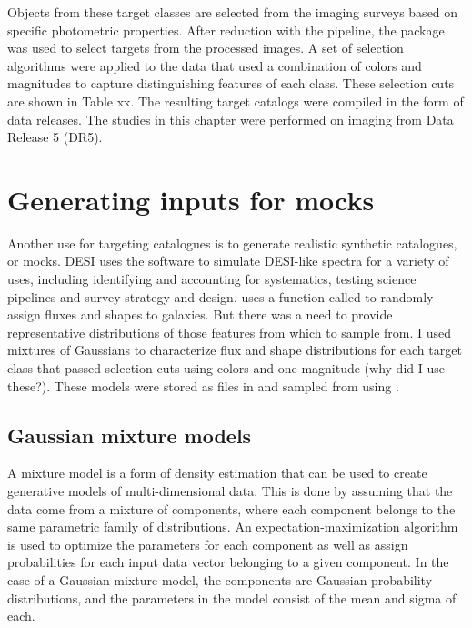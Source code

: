 Objects from these target classes are selected from the imaging surveys based on specific photometric properties. After reduction with the  pipeline, the  package was used to select targets from the processed images. A set of selection algorithms were applied to the data that used a combination of colors and magnitudes to capture distinguishing features of each class. These selection cuts are shown in Table xx. The resulting target catalogs were compiled in the form of data releases. The studies in this chapter were performed on imaging from Data Release 5 (DR5).

\section{Generating inputs for mocks}
Another use for targeting catalogues is to generate realistic synthetic catalogues, or mocks. DESI uses the  software to simulate DESI-like spectra for a variety of uses, including identifying and accounting for systematics, testing science pipelines and survey strategy and design.  uses a function called  to randomly assign fluxes and shapes to galaxies. But there was a need to provide representative distributions of those features from which to sample from. I used mixtures of Gaussians to characterize flux and shape distributions for each target class that passed selection cuts using colors and one magnitude (why did I use these?). These models were stored as  files in  and sampled from using .


\subsection{Gaussian mixture models}

A mixture model is a form of density estimation that can be used to create generative models of multi-dimensional data. This is done by assuming that the data come from a mixture of components, where each component belongs to the same parametric family of distributions. An expectation-maximization algorithm is used to optimize the parameters for each component as well as assign probabilities for each input data vector belonging to a given component. In the case of a Gaussian mixture model, the components are Gaussian probability distributions, and the parameters in the model consist of the mean and sigma of each. 

